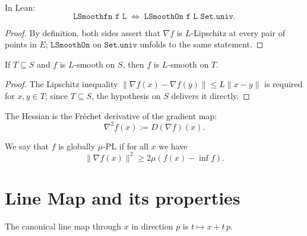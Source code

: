 \begin{lemma}\label{lem:lSmooth_iff_lSmoothOn_univ}
  \leanok{}
  In Lean:
  \[
    \texttt{LSmoothfn f L} \;\Longleftrightarrow\; \texttt{LSmoothOn f L Set.univ}.
  \]
\end{lemma}
\begin{proof}
  \leanok{}
  By definition, both sides assert that $\nabla f$ is $L$-Lipschitz at every pair of points in $E$;
  $\texttt{LSmoothOn}$ on $\texttt{Set.univ}$ unfolds to the same statement.
\end{proof}

\begin{lemma}\label{lem:LSmoothOn_mono}
  \leanok{}
  If $T \subseteq S$ and $f$ is $L$-smooth on $S$, then $f$ is $L$-smooth on $T$.
\end{lemma}
\begin{proof}
  \leanok{}
  The Lipschitz inequality $\|\nabla f(x)-\nabla f(y)\|\le L\|x-y\|$ is required for $x,y\in T$;
  since $T\subseteq S$, the hypothesis on $S$ delivers it directly.
\end{proof}

\begin{definition}[Hessian]\label{def:hessian}
  \leanok{}
  \uses{}
  The Hessian is the Fr\'echet derivative of the gradient map:
  \[
    \nabla^2 f(x) := D(\nabla f)(x).
  \]
\end{definition}


\begin{definition}\label{def:GloballyPL}
  \leanok{}
  \uses{}
  We say that $f$ is globally $\mu$-PL if for all $x$ we have
\[
  \|\nabla f(x)\|^2 \ge 2\mu (f(x) - \inf f).
\]

\end{definition}


\section{Line Map and its properties}
\begin{definition}\label{def:lineMap}
  \leanok{}
  \uses{}
  The canonical line map through $x$ in direction $p$ is
  \(
    t \mapsto x + t\,p.
  \)
\end{definition}

